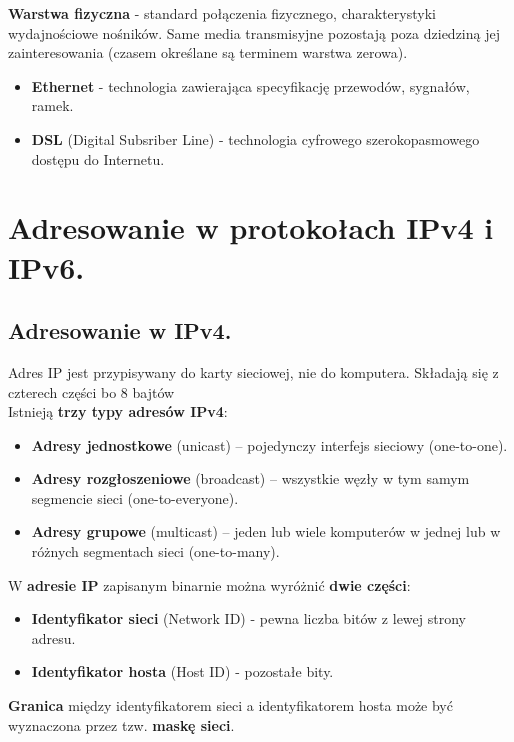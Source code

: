\documentclass[12pt]{article}
\begin{document}
    \noindent \textbf{Warstwa fizyczna} - standard połączenia fizycznego, charakterystyki wydajnościowe nośników. Same media transmisyjne pozostają poza dziedziną jej
    zainteresowania (czasem określane są terminem warstwa zerowa).
    \begin{itemize}
        \item \textbf{Ethernet} - technologia zawierająca specyfikację przewodów, sygnałów, ramek.
        \item \textbf{DSL} (Digital Subsriber Line) - technologia cyfrowego szerokopasmowego dostępu do Internetu.
    \end{itemize}

    \newpage

    \section{Adresowanie w protokołach IPv4 i IPv6.}

    \subsection{Adresowanie w IPv4.}
    Adres IP jest przypisywany do karty sieciowej, nie do komputera. Składają się z czterech części bo 8 bajtów\\

    \noindent Istnieją \textbf{trzy typy adresów IPv4}:
    \begin{itemize}
        \item \textbf{Adresy jednostkowe} (unicast) – pojedynczy interfejs sieciowy (one-to-one).
        \item \textbf{Adresy rozgłoszeniowe} (broadcast) – wszystkie węzły w tym samym segmencie sieci (one-to-everyone).
        \item \textbf{Adresy grupowe} (multicast) – jeden lub wiele komputerów w jednej lub w różnych segmentach sieci (one-to-many).
    \end{itemize}

    \noindent W \textbf{adresie IP} zapisanym binarnie można wyróżnić \textbf{dwie części}:
    \begin{itemize}
        \item \textbf{Identyfikator sieci} (Network ID) - pewna liczba bitów z lewej strony adresu.
        \item \textbf{Identyfikator hosta} (Host ID) - pozostałe bity.
    \end{itemize}
    \textbf{Granica} między identyfikatorem sieci a identyfikatorem hosta może być wyznaczona przez
    tzw. \textbf{maskę sieci}.
\end{document}
